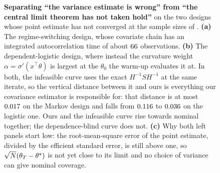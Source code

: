 \begin{figure}[tbp]
\centering
{}
\caption{\textbf{Separating ``the variance estimate is wrong'' from ``the central limit theorem has
not taken hold''} on the two designs whose point estimate has not converged at the sample sizes of
. \textbf{(a)} The regime-switching design, whose covariate chain has an integrated
autocorrelation time of about $66$ observations. \textbf{(b)} The dependent-logistic design,
where instead the curvature weight $\alpha=\sigma'(x^{\!\top}\theta)$ is largest at the $\theta_0$
the warm-up evaluates it at. In both, the infeasible curve uses the exact $H^{-1}SH^{-1}$ at the
same iterate, so the vertical distance between it and ours is everything our covariance estimator is
responsible for: that distance is at most $0.017$ on the Markov design and falls from
$0.116$ to $0.036$ on the logistic one. Ours and the infeasible curve rise
towards nominal together; the dependence-blind curve does not. \textbf{(c)} Why both left panels
start low: the root-mean-square error of the point estimate, divided by the efficient standard
error, is still above one, so $\sqrt N(\theta_T-\theta^\star)$ is not yet close to its limit and no choice of
variance can give nominal coverage.}
\label{fig:hard}
\end{figure}
